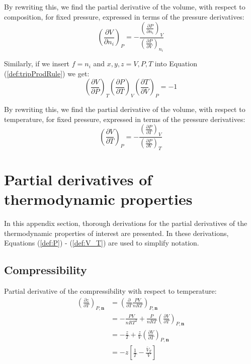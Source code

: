 \documentclass[internal,english]{sintefmemo2012}
\numberwithin{equation}{section}
\newcommand*{\pder}[2]{\left(\frac{\partial #1}{\partial #2}\right)}
\newcommand*{\reff}[1]{(\ref{#1})}
\begin{document}
By rewriting this, we find the partial derivative of the volume, with respect to composition, for fixed pressure, expressed in terms of the pressure derivatives:
\begin{equation}
\pder{V}{n_i}_P = - \frac{\pder{P}{n_i}_V}{\pder{P}{V}_{n_i}}
\end{equation}

Similarly, if we insert $f = n_i$ and $x,y,z = V,P,T$ into Equation \reff{def:tripProdRule} we get:
\begin{equation}
\pder{V}{P}_{T} \pder{P}{T}_V \pder{T}{V}_P = -1
\end{equation}

By rewriting this, we find the partial derivative of the volume, with respect to temperature, for fixed pressure, expressed in terms of the pressure derivatives:
\begin{equation}
\pder{V}{T}_P = - \frac{\pder{P}{T}_V}{\pder{P}{V}_{T}}
\end{equation}

\section{Partial derivatives of thermodynamic properties}
\label{app:partDerivatives}
In this appendix section, thorough derivations for the partial derivatives of the thermodynamic properties of interest are presented. In these derivations, Equations \reff{def:P} - \reff{def:V_T} are used to simplify notation.
\subsection{Compressibility}
Partial derivative of the compressibility with respect to temperature:
\begin{equation}
\begin{split}
\left( \frac{\partial z}{\partial T} \right)_{P, \textbf{n}}
& = \left( \frac{\partial }{\partial T} \frac{PV}{nRT}\right)_{P, \textbf{n}} \\
& = - \frac{PV}{nRT^2} + \frac{P}{nRT} \left( \frac{\partial V}{\partial T} \right)_{P, \textbf{n}} \\
& = - \frac{z}{T} + \frac{z}{V} \left( \frac{\partial V}{\partial T} \right)_{P, \textbf{n}} \\
& = -z\left[\frac{1}{T} - \frac{\bar{V}_T}{V}\right]
\end{split}
\end{equation}
\end{document}
